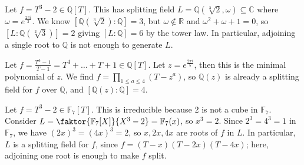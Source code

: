 \begin{example}
	Let \( f = T^3 - 2 \in \mathbb Q[T] \).
	This has splitting field \( L = \mathbb Q(\sqrt[3]{2}, \omega) \subseteq \mathbb C \) where \( \omega = e^{\frac{2\pi i}{3}} \).
	We know \( [\mathbb Q(\sqrt[3]{2}) : \mathbb Q] = 3 \), but \( \omega \not\in \mathbb R \) and \( \omega^2 + \omega + 1 = 0 \), so \( [L : \mathbb Q(\sqrt[2]{3})] = 2 \) giving \( [L : \mathbb Q] = 6 \) by the tower law.
	In particular, adjoining a single root to \( \mathbb Q \) is not enough to generate \( L \).
\end{example}
\begin{example}
	Let \( f = \frac{T^5 - 1}{T - 1} = T^4 + \dots + T + 1 \in \mathbb Q[T] \).
	Let \( z = e^{\frac{2\pi i}{5}} \), then this is the minimal polynomial of \( z \).
	We find \( f = \prod_{1 \leq a \leq 4} (T - z^a) \), so \( \mathbb Q(z) \) is already a splitting field for \( f \) over \( \mathbb Q \), and \( [\mathbb Q(z) : \mathbb Q] = 4 \).
\end{example}
\begin{example}
	Let \( f = T^3 - 2 \in \mathbb F_7[T] \).
	This is irreducible because 2 is not a cube in \( \mathbb F_7 \).
	Consider \( L = \faktor{\mathbb F_7[X]}{X^3 - 2} = \mathbb F_7(x) \), so \( x^3 = 2 \).
	Since \( 2^3 = 4^3 = 1 \) in \( \mathbb F_7 \), we have \( (2x)^3 = (4x)^3 = 2 \), so \( x, 2x, 4x \) are roots of \( f \) in \( L \).
	In particular, \( L \) is a splitting field for \( f \), since \( f = (T - x)(T - 2x)(T - 4x) \); here, adjoining one root is enough to make \( f \) split.
\end{example}

